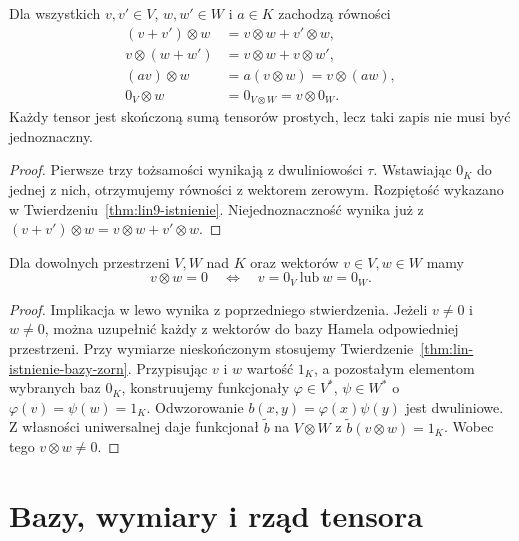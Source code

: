 \begin{stwierdzenie}
\label{prop:lin9-tozsamosci}
Dla wszystkich \(v,v'\in V\),
\(w,w'\in W\) i \(a\in K\)
zachodzą równości
\[
 \begin{aligned}
 (v+v')\otimes w&=v\otimes w+v'\otimes w,\\
 v\otimes(w+w')&=v\otimes w+v\otimes w',\\
 (av)\otimes w&=a(v\otimes w)=v\otimes(aw),\\
 0_V\otimes w&=0_{V\otimes W}=v\otimes0_W.
 \end{aligned}
\]
Każdy tensor jest skończoną sumą
tensorów prostych, lecz taki zapis
nie musi być jednoznaczny.
\end{stwierdzenie}
\begin{proof}
Pierwsze trzy tożsamości
wynikają z dwuliniowości \(\tau\).
Wstawiając \(0_K\) do jednej z nich,
otrzymujemy równości z wektorem
zerowym.
Rozpiętość wykazano w
Twierdzeniu~\ref{thm:lin9-istnienie}.
Niejednoznaczność wynika już z
\((v+v')\otimes w
=v\otimes w+v'\otimes w\).
\end{proof}

\begin{stwierdzenie}
\label{prop:lin9-zerowanie}
Dla dowolnych przestrzeni
\(V,W\) nad \(K\)
oraz wektorów \(v\in V,w\in W\)
mamy
\[
 v\otimes w=0\quad\Longleftrightarrow\quad
 v=0_V\ \text{lub}\ w=0_W.
\]
\end{stwierdzenie}
\begin{proof}
Implikacja w lewo wynika
z poprzedniego stwierdzenia.
Jeżeli \(v\ne0\) i \(w\ne0\),
można uzupełnić każdy z wektorów
do bazy Hamela odpowiedniej przestrzeni.
Przy wymiarze nieskończonym
stosujemy
Twierdzenie~\ref{thm:lin-istnienie-bazy-zorn}.
Przypisując \(v\) i \(w\)
wartość \(1_K\), a pozostałym
elementom wybranych baz \(0_K\),
konstruujemy funkcjonały
\(\varphi\in V^*\), \(\psi\in W^*\)
o \(\varphi(v)=\psi(w)=1_K\).
Odwzorowanie
\(b(x,y)=\varphi(x)\psi(y)\)
jest dwuliniowe.
Z własności uniwersalnej
daje funkcjonał \(\widetilde b\)
na \(V\otimes W\) z
\(\widetilde b(v\otimes w)=1_K\).
Wobec tego \(v\otimes w\ne0\).
\end{proof}

\section{Bazy, wymiary i rząd tensora}
\label{sec:lin9-bazy}

